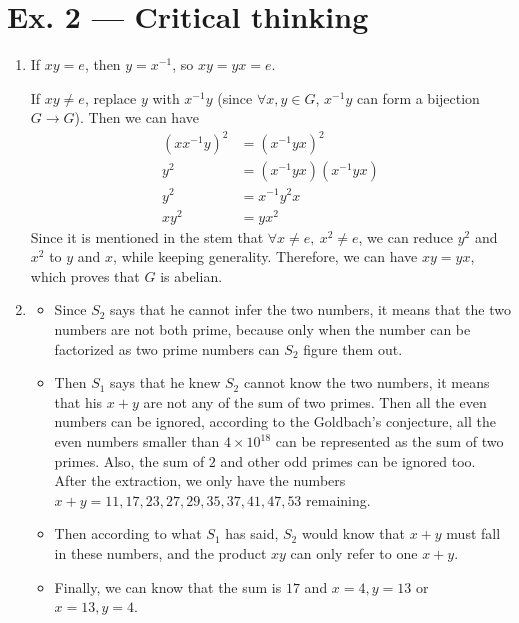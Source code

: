 \documentclass[12pt, a4paper]{article}
\begin{document}
\section*{Ex. 2 --- Critical thinking}
\begin{enumerate}
    \item If $xy = e$, then $y = x^{-1}$, so $xy = yx = e$.
          
          If $xy \neq e$, replace $y$ with $x^{-1}y$ (since $\forall x, y\in G$, $x^{-1}y$ can form a bijection $G \rightarrow G$). 
          Then we can have 
          \begin{align*}
              (xx^{-1}y)^2 &= (x^{-1}yx)^2\\
              y^2          &= (x^{-1}yx)(x^{-1}yx)\\
              y^2          &= x^{-1}y^2x\\
              xy^2         &= yx^2
          \end{align*}
          Since it is mentioned in the stem that $\forall x \neq e,\ x^2 \neq e$, we can reduce $y^2$ and $x^2$ to $y$ and $x$, 
          while keeping generality. Therefore, we can have $xy = yx$, which proves that $G$ is abelian.
    \item \begin{itemize}
        \item Since $S_2$ says that he cannot infer the two numbers, it means that the two numbers are not both prime, 
              because only when the number can be factorized as two prime numbers can $S_2$ figure them out.
        \item Then $S_1$ says that he knew $S_2$ cannot know the two numbers, 
              it means that his $x+y$ are not any of the sum of two primes. Then all the even numbers can be ignored, 
              according to the Goldbach's conjecture, 
              all the even numbers smaller than $4\times 10^18$ can be represented as the sum of two primes. 
              Also, the sum of $2$ and other odd primes can be ignored too. After the extraction, 
              we only have the numbers $x+y = 11, 17, 23, 27, 29, 35, 37, 41, 47, 53$ remaining.
        \item Then according to what $S_1$ has said, $S_2$ would know that $x+y$ must fall in these numbers, 
              and the product $xy$ can only refer to one $x + y$.
        \item Finally, we can know that the sum is $17$ and $x = 4, y = 13$ or $x = 13, y = 4$.
    \end{itemize}


\end{enumerate}
\end{document}
